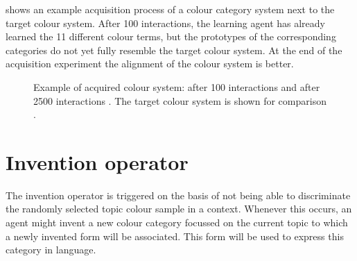  shows an example
acquisition process of a colour category system next to the target
colour system. After 100 interactions, the learning agent has already
learned the 11 different colour terms, but the prototypes of the
corresponding categories do not yet fully resemble the target colour
system. At the end of the acquisition experiment the alignment of the
colour system is better.

\begin{figure}[htbp]
\centering
{}
\caption[Example of an acquired and target colour system]{Example of
  acquired colour system: after 100 interactions
   and after 2500
  interactions . The target
  colour system is shown for comparison
  .}
\label{f:basic-strategy-acquisition-lexicon}
\end{figure}

\section{Invention operator}
\label{s:bcs-invention-operators}

The invention operator
is triggered on the basis of not being able
to discriminate the randomly selected topic colour sample in a
context. Whenever this occurs, an agent might invent a new colour
category focussed on the current topic to which a newly invented form
will be associated. This form will be used to express this category in
language.

